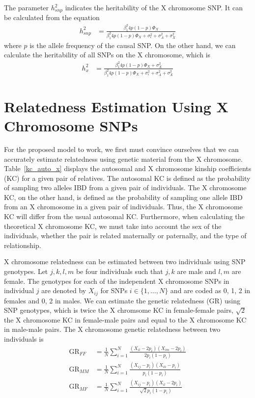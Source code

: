 \documentclass[11pt]{article} %
\begin{document}
The parameter $h^2_{snp}$ indicates the heritability of the X chromosome SNP. It can be calculated from the equation
\begin{align}
h^2_{snp}&=\frac{\beta_1^2 4p(1-p)\Phi_X}{\beta_1^2 4p(1-p)\Phi_X+\sigma^2_\epsilon + \sigma^2_A + \sigma^2_X}
\end{align}
where $p$ is the allele frequency of the causal SNP.
On the other hand, we can calculate the heritability of all SNPs on the X chromosome, which is 
\begin{align}
h^2_{x}&=\frac{\beta_1^2 4p(1-p)\Phi_X+\sigma^2_X}{\beta_1^2 4p(1-p)\Phi_X+\sigma^2_\epsilon + \sigma^2_A + \sigma^2_X}
\end{align}


\section*{Relatedness Estimation Using X Chromosome SNPs}

For the proposed model to work, we first must convince ourselves that we can accurately estimate relatedness using genetic material from the X chromosome. 
Table~\ref{kc_auto_x} displays the autosomal and X chromosome kinship coefficients (KC) for a given pair of relatives. The autosomal KC is defined as the probability of sampling two alleles IBD from a given pair of individuals. The X chromosome KC, on the other hand, is defined as the probability of sampling one allele IBD from an X chromosome in a given pair of individuals. Thus, the X chromosome KC will differ from the usual autosomal KC. Furthermore, when calculating the theoretical X chromosome KC, we must take into account the sex of the individuals, whether the pair is related maternally or paternally, and the type of relationship.

X chromosome relatedness can be estimated between two individuals using SNP genotypes. Let $j, k, l, m$ be four individuals such that $j, k$ are male and $l, m$ are female. The genotypes for each of the independent X chromosome SNPs in individual $j$ are denoted by $X_{ij}$ for SNPs $i \in \{1,\dots,N\}$ and are coded as 0, 1, 2 in females and 0, 2 in males.
We can estimate the genetic relatedness (GR) using SNP genotypes, which is twice the X chromsome KC in female-female pairs, $\sqrt{2}$ the X chromosome KC in female-male pairs and equal to the X chromosome KC in male-male pairs.
The X chromosome genetic relatedness between two individuals is
\begin{align}
\mbox{GR}_{FF}&=\frac{1}{N}\sum_{i=1}^N \frac{(X_{il}-2p_i)(X_{im}-2p_i)}{2p_i(1-p_i)}\\
\mbox{GR}_{MM}&=\frac{1}{N}\sum_{i=1}^N \frac{(X_{ij}-p_i)(X_{ik}-p_i)}{p_i(1-p_i)}\\
\mbox{GR}_{MF}&=\frac{1}{N}\sum_{i=1}^N \frac{(X_{ij}-p_i)(X_{il}-2p_i)}{\sqrt{2}p_i(1-p_i)}
\end{align}
\end{document}

